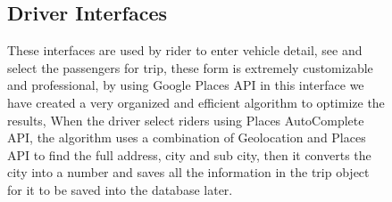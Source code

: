 \begin{figure}
\hspace*{\fill}
\hfill 
{}
\hspace*{\fill}
\end{figure}

\begin{figure}
\subsection{Driver Interfaces}
These interfaces are used by rider to enter vehicle detail, see and select the passengers for trip, these form is extremely customizable and professional, by using Google Places API in this interface we have created a very organized and efficient algorithm to optimize the results, When the driver select riders using Places AutoComplete API, the algorithm uses a combination of Geolocation and Places API to find the full address, city and sub city, then it converts the city into a number and saves all the information in the trip object for it to be saved into the database later.
\hspace*{\fill}
\hfill 
{}
\hspace*{\fill}\\
\hspace*{\fill}
\hfill 
{}
\hspace*{\fill}
\end{figure}

\begin{figure}
\hspace*{\fill}
\hfill 
{}
\hspace*{\fill}
\end{figure}

\begin{figure}
\centering
{}
\end{figure}